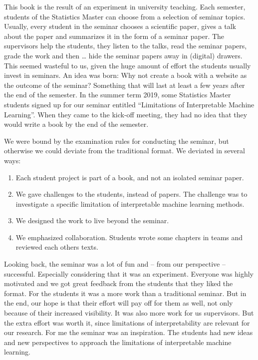 \documentclass[]{krantz}
\providecommand{\tightlist}{%
  \setlength{\itemsep}{0pt}\setlength{\parskip}{0pt}}
\begin{document}
This book is the result of an experiment in university teaching. Each
semester, students of the Statistics Master can choose from a selection
of seminar topics. Usually, every student in the seminar chooses a
scientific paper, gives a talk about the paper and summarizes it in the
form of a seminar paper. The supervisors help the students, they listen
to the talks, read the seminar papers, grade the work and then \ldots{}
hide the seminar papers away in (digital) drawers. This seemed wasteful
to us, given the huge amount of effort the students usually invest in
seminars. An idea was born: Why not create a book with a website as the
outcome of the seminar? Something that will last at least a few years
after the end of the semester. In the summer term 2019, some Statistics
Master students signed up for our seminar entitled ``Limitations of
Interpretable Machine Learning''. When they came to the kick-off
meeting, they had no idea that they would write a book by the end of the
semester.

We were bound by the examination rules for conducting the seminar, but
otherwise we could deviate from the traditional format. We deviated in
several ways:

\begin{enumerate}
\def\labelenumi{\arabic{enumi}.}
\tightlist
\item
  Each student project is part of a book, and not an isolated seminar
  paper.
\item
  We gave challenges to the students, instead of papers. The challenge
  was to investigate a specific limitation of interpretable machine
  learning methods.
\item
  We designed the work to live beyond the seminar.
\item
  We emphasized collaboration. Students wrote some chapters in teams and
  reviewed each others texts.
\end{enumerate}

Looking back, the seminar was a lot of fun and -- from our perspective
-- successful. Especially considering that it was an experiment.
Everyone was highly motivated and we got great feedback from the
students that they liked the format. For the students it was a more work
than a traditional seminar. But in the end, our hope is that their
effort will pay off for them as well, not only because of their
increased visibility. It was also more work for us supervisors. But the
extra effort was worth it, since limitations of interpretability are
relevant for our research. For me the seminar was an inspiration. The
students had new ideas and new perspectives to approach the limitations
of interpretable machine learning.
\end{document}
